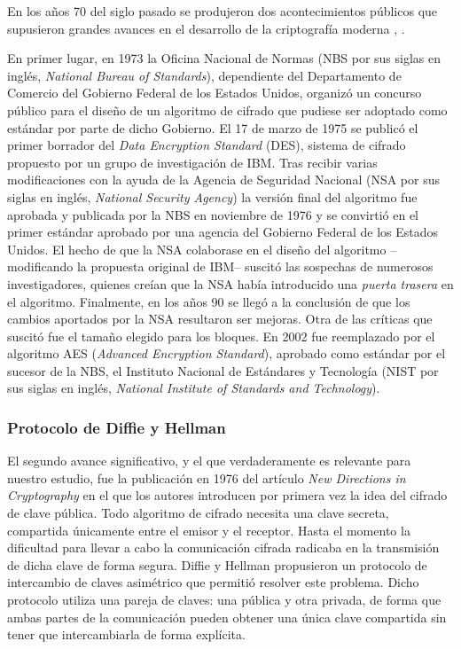 \documentclass[
  a4paper,
  12pt,
  spanish,
]{scrartcl}
\begin{document}
En los años 70 del siglo pasado se produjeron dos acontecimientos públicos que supusieron grandes avances en el desarrollo de la criptografía moderna \parencite{singh_code_2003}, \parencite{thawte_history_2013}.

En primer lugar, en 1973 la Oficina Nacional de Normas (NBS por sus siglas en inglés, \textit{National Bureau of Standards}), dependiente del Departamento de Comercio del Gobierno Federal de los Estados Unidos, organizó un concurso público para el diseño de un algoritmo de cifrado que pudiese ser adoptado como estándar por parte de dicho Gobierno. 
El 17 de marzo de 1975 se publicó el primer borrador del \textit{Data Encryption Standard} (DES), sistema de cifrado propuesto por un grupo de investigación de IBM.
Tras recibir varias modificaciones con la ayuda de la Agencia de Seguridad Nacional (NSA por sus siglas en inglés, \textit{National Security Agency}) la versión final del algoritmo fue aprobada y publicada por la NBS en noviembre de 1976 y se convirtió en el primer estándar aprobado por una agencia del Gobierno Federal de los Estados Unidos. 
El hecho de que la NSA colaborase en el diseño del algoritmo --modificando la propuesta original de IBM-- suscitó las sospechas de numerosos investigadores, quienes creían que la NSA había introducido una \textit{puerta trasera} en el algoritmo. 
Finalmente, en los años 90 se llegó a la conclusión de que los cambios aportados por la NSA resultaron ser mejoras.
Otra de las críticas que suscitó fue el tamaño elegido para los bloques.
En 2002 fue reemplazado por el algoritmo AES (\textit{Advanced Encryption Standard}), aprobado como estándar por el sucesor de la NBS, el Instituto Nacional de Estándares y Tecnología (NIST por sus siglas en inglés, \textit{National Institute of Standards and Technology}).

\subsubsection{Protocolo de Diffie y Hellman}

El segundo avance significativo, y el que verdaderamente es relevante para nuestro estudio, fue la publicación en 1976 del artículo \textit{New Directions in Cryptography} \parencite{diffie_new_1976} en el que los autores introducen por primera vez la idea del cifrado de clave pública. 
Todo algoritmo de cifrado necesita una clave secreta, compartida únicamente entre el emisor y el receptor. 
Hasta el momento la dificultad para llevar a cabo la comunicación cifrada radicaba en la transmisión de dicha clave de forma segura. 
Diffie y Hellman propusieron un protocolo de intercambio de claves asimétrico que permitió resolver este problema. 
Dicho protocolo utiliza una pareja de claves: una pública y otra privada, de forma que ambas partes de la comunicación pueden obtener una única clave compartida sin tener que intercambiarla de forma explícita. 
\end{document}
